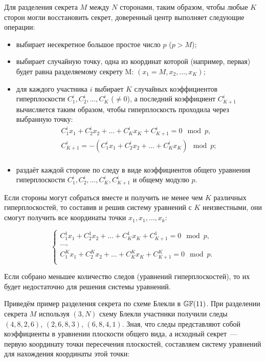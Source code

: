 Для разделения секрета $M$ между $N$ сторонами, таким образом, чтобы любые $K$ сторон могли восстановить секрет, доверенный центр выполняет следующие операции:
\begin{itemize}
	\item выбирает несекретное большое простое число $p$ ($p > M$);
	\item выбирает случайную точку, одна из координат которой (например, первая) будет равна разделяемому секрету M: $(x_1 = M, x_2, \dots, x_K)$;
	\item для каждого участника $i$ выбирает $K$ случайных коэффициентов гиперплоскости $C^i_1, C^i_2, \dots, C^i_{K}$ ($\ne 0$), а последний коэффициент $C^i_{K+1}$ вычисляется таким образом, чтобы гиперплоскость проходила через выбранную точку:
		\[ \begin{array}{l}
			C^i_1 x_1 + C^i_2 x_2 + \dots + C^i_K x_K + C^i_{K+1} = 0 \mod p, \\
			C^i_{K+1} = - ( C^i_1 x_1 + C^i_2 x_2 + \dots + C^i_K x_K ) \mod p; \\
		\end{array} \]
	\item раздаёт каждой стороне по следу в виде коэффициентов общего уравнения гиперплоскости $C^i_1, C^i_2, \dots, C^i_{K}, C^i_{K+1}$ и общему модулю $p$.
\end{itemize}

Если стороны могут собраться вместе и получить не менее чем $K$ различных гиперплоскостей, то составив и решив систему уравнений с $K$ неизвестными, они смогут получить все координаты точки $x_1, x_1, \dots, x_k$:

\[ \left\{ \begin{array}{l}
    C^1_1 x_1 + C^1_2 x_2 + \dots + C^1_K x_K + C^1_{K+1} = 0 \mod p, \\
    \dots, \\
    C^K_1 x_1 + C^K_2 x_2 + \dots + C^K_K x_K + C^K_{K+1} = 0 \mod p. \\
\end{array} \right. \]

Если собрано меньшее количество следов (уравнений гиперплоскостей), то их будет недостаточно для решения системы уравнений.

\example
Приведём пример разделения секрета по схеме Блекли в $\mathbb{GF}(11)$. При разделении секрета $M$ используя $(3,N)$ схему Блекли участники получили следы $(4, 8, 2, 6)$, $(2, 6, 8, 3)$, $(6, 8, 4, 1)$. Зная, что следы представляют собой коэффициенты в уравнении плоскости общего вида, а исходный секрет~--- первую координату точки пересечения плоскостей, составляем систему уравнений для нахождения координаты этой точки:

